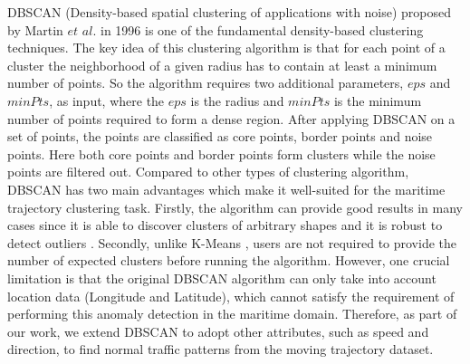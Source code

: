 \documentclass[12pt,glossary]{dalcsthesis}
\begin{document}
 DBSCAN (Density-based spatial clustering of applications with noise) proposed by Martin $et$ $al.$  \cite{DBScan96} in 1996 is one of the fundamental density-based clustering techniques.  The key idea of this clustering algorithm is that for each point of a cluster the neighborhood of a given radius has to contain at least a minimum number of points. So the algorithm requires two additional parameters, $eps$ and $minPts$, as input, where the $eps$ is the radius and $minPts$ is the minimum number of points required to form a dense region.  After applying DBSCAN on a set of points, the points are classified as core points, border points and noise points. Here both core points and border points form clusters while the noise points are filtered out. Compared to other types of clustering algorithm, DBSCAN has two main advantages which make it well-suited for the maritime trajectory clustering task. Firstly, the algorithm can provide good results in many cases since it is able to discover clusters of arbitrary shapes and it is robust to detect outliers \cite{hanjiaweibook}.  Secondly, unlike K-Means \cite{kmeans}, users are not required to provide the number of expected clusters before running the algorithm.  However, one crucial limitation is that the original DBSCAN algorithm can only take into account location data (Longitude and Latitude), which cannot satisfy the requirement of performing this anomaly detection in the maritime domain.  Therefore, as part of our work, we extend DBSCAN to adopt other attributes, such as speed and direction, to find normal traffic patterns from the moving trajectory dataset.
\end{document}
